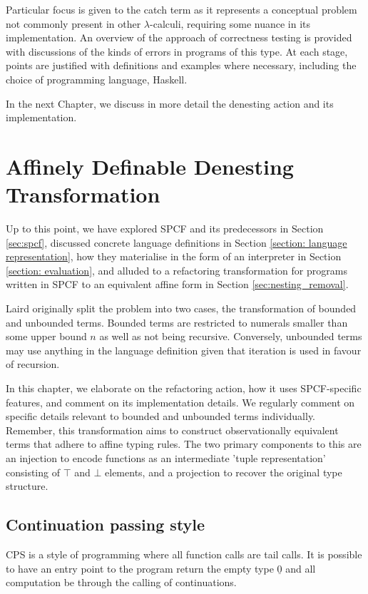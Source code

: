 \documentclass[12pt,a4paper]{report}
\theoremstyle{definition}
\theoremstyle{definition}
\theoremstyle{remark}
\begin{document}
Particular focus is given to the catch term as it represents a conceptual problem not commonly present in other $\lambda$-calculi, requiring some nuance in its implementation. An overview of the approach of correctness testing is provided with discussions of the kinds of errors in programs of this type. At each stage, points are justified with definitions and examples where necessary, including the choice of programming language, Haskell.

In the next Chapter, we discuss in more detail the denesting action and its implementation.

\chapter{Affinely Definable Denesting Transformation}\label{chapter: denesting}
Up to this point, we have explored SPCF and its predecessors in Section \ref{sec:spcf}, discussed concrete language definitions in Section \ref{section: language representation}, how they materialise in the form of an interpreter in Section \ref{section: evaluation}, and alluded to a refactoring transformation for programs written in SPCF to an equivalent affine form in Section \ref{sec:nesting_removal}. 

Laird originally split the problem into two cases, the transformation of bounded and unbounded terms. Bounded terms are restricted to numerals smaller than some upper bound $n$ as well as not being recursive. Conversely, unbounded terms may use anything in the language definition given that iteration is used in favour of recursion.

In this chapter, we elaborate on the refactoring action, how it uses SPCF-specific features, and comment on its implementation details. We regularly comment on specific details relevant to bounded and unbounded terms individually. Remember, this transformation aims to construct observationally equivalent terms that adhere to affine typing rules. The two primary components to this are an injection to encode functions as an intermediate 'tuple representation' consisting of $\top$ and $\bot$ elements, and a projection to recover the original type structure.

\section{Continuation passing style}
CPS is a style of programming where all function calls are tail calls. It is possible to have an entry point to the program return the empty type $\underline{0}$ and all computation be through the calling of continuations.
\end{document}
